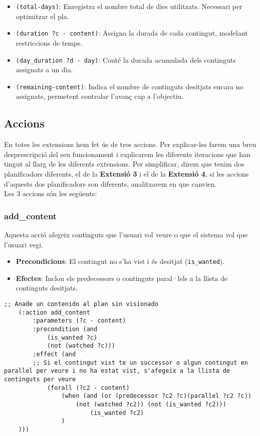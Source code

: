 \documentclass[a4paper]{article}
\begin{document}
	\begin{itemize}
		\item \texttt{(total-days)}: Enregistra el nombre total de dies utilitzats. Necessari per optimitzar el pla.
		\item \texttt{(duration ?c - content)}: Assigna la durada de cada contingut, modelant restriccions de temps.
		\item \texttt{(day\_duration ?d - day)}: Conté la durada acumulada dels continguts assignats a un dia.
		\item \texttt{(remaining-content)}: Indica el nombre de continguts desitjats encara no assignats, permetent controlar l'avanç cap a l'objectiu.
	\end{itemize}
	
	\subsection{Accions}
	
	En totes les extensions hem fet ús de tres accions. Per explicar-les farem una breu desprescripció del seu funcionament i explicarem les diferents iteracions que han tingut al llarg de les diferents extensions. Per simplificar, direm que tenim dos planificadors diferents, el de la \textbf{Extensió 3} i el de la \textbf{Extensió 4}, si les accions d'aquests dos planificadors son diferents, analitzarem en que canvien. \\
	
	Les 3 accions són les següents:
	
	\subsubsection*{add\_content}
	
	Aquesta acció afegeix continguts que l'usuari vol veure o que el sistema vol que l'usuari vegi.
	
	\begin{itemize}
		\item \textbf{Precondicions}: El contingut no s'ha vist i és desitjat (\texttt{is\_wanted}).
		\item \textbf{Efectes}: Inclou els predecessors o continguts paral·lels a la llista de continguts desitjats.
	\end{itemize}
	
	\begin{lstlisting}[language=PDDL, caption={Acció add\_content}, label={lst:add_content}]
	;; Anade un contenido al plan sin visionado
	(:action add_content
		:parameters (?c - content)
		:precondition (and 
			(is_wanted ?c)
			(not (watched ?c)))
		:effect (and 
		;; Si el contingut vist te un successor o algun contingut en parallel per veure i no ha estat vist, s'afegeix a la llista de continguts per veure
			(forall (?c2 - content)
				(when (and (or (predecessor ?c2 ?c)(parallel ?c2 ?c))
					(not (watched ?c2)) (not (is_wanted ?c2)))
						(is_wanted ?c2)
				)		
	)))
	\end{lstlisting}
	
\end{document}
